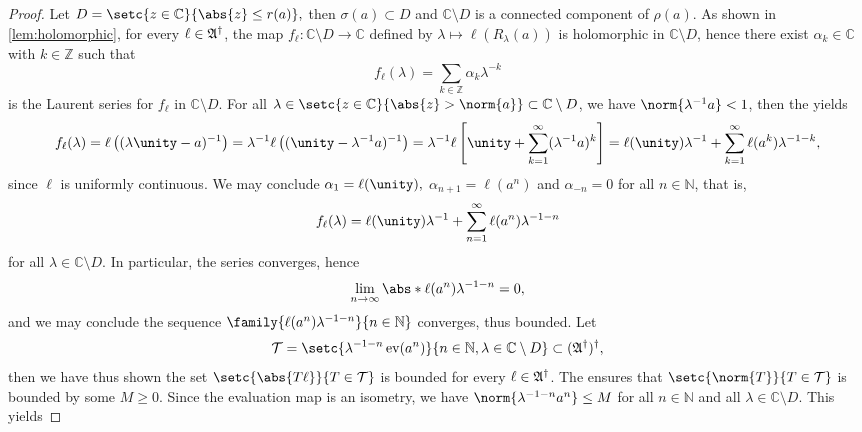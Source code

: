 \begin{proof}
    Let \(D = \setc{z \in \mathbb{C}}{\abs{z} \leq r(a)},\) then \(\sigma(a) \subset D\) and \(\mathbb{C} \setminus D\) is a connected component of \(\rho(a)\). As shown in \cref{lem:holomorphic}, for every \(\ell \in \mathfrak{A}^\dag\), the map \(f_\ell : \mathbb{C}\setminus D \to \mathbb{C}\) defined by \(\lambda \mapsto \ell(R_{\lambda}(a))\) is holomorphic in \(\mathbb{C} \setminus D\), hence there exist \(\alpha_k \in \mathbb{C}\) with \(k \in \mathbb{Z}\) such that
    \begin{equation*}
        f_\ell(\lambda) = \sum_{k \in \mathbb{Z}} \alpha_k \lambda^{-k}
    \end{equation*}
    is the Laurent series for \(f_\ell\) in \(\mathbb{C} \setminus D\). For all \(\lambda \in \setc{z \in \mathbb{C}}{\abs{z} > \norm{a}} \subset \mathbb{C} \setminus D\), we have \(\norm{\lambda^{-1}a} < 1\), then the  yields
    \begin{equation*}
        f_\ell(\lambda) = \ell\left((\lambda \unity - a)^{-1}\right)= \lambda^{-1} \ell\left((\unity - \lambda^{-1}a)^{-1}\right) = \lambda^{-1} \ell\left[\unity + \sum_{k = 1}^\infty (\lambda^{-1}a)^k\right] = \ell(\unity)\lambda^{-1} + \sum_{k = 1}^\infty \ell(a^k)\lambda^{-1 - k},
    \end{equation*}
    since \(\ell\) is uniformly continuous. We may conclude \(\alpha_1 = \ell(\unity),\) \(\alpha_{n+1} = \ell(a^n)\) and \(\alpha_{-n} = 0\) for all \(n \in \mathbb{N}\), that is,
    \begin{equation*}
        f_\ell(\lambda) = \ell(\unity)\lambda^{-1} + \sum_{n = 1}^\infty \ell(a^n) \lambda^{-1 - n}
    \end{equation*}
    for all \(\lambda \in \mathbb{C} \setminus D\). In particular, the series converges, hence
    \begin{equation*}
        \lim_{n\to \infty}{\abs*{\ell(a^n) \lambda^{-1-n}}} = 0,
    \end{equation*}
    and we may conclude the sequence \(\family{\ell(a^n)\lambda^{-1-n}}{n \in \mathbb{N}}\) converges, thus bounded. Let
    \begin{equation*}
        \mathcal{T} = \setc{\lambda^{-1-n} \eval(a^n)}{n \in \mathbb{N}, \lambda \in \mathbb{C}\setminus D} \subset (\algebra{A}^\dag)^\dag,
    \end{equation*}
    then we have thus shown the set \(\setc{\abs{T\ell}}{T \in \mathcal{T}}\) is bounded for every \(\ell \in \mathfrak{A}^\dag\). The  ensures that \(\setc{\norm{T}}{T \in \mathcal{T}}\) is bounded by some \(M \geq 0\). Since the evaluation map is an isometry, we have \(\norm{\lambda^{-1-n}a^n} \leq M\) for all \(n \in \mathbb{N}\) and all \(\lambda \in \mathbb{C} \setminus D\). This yields

\end{proof}
